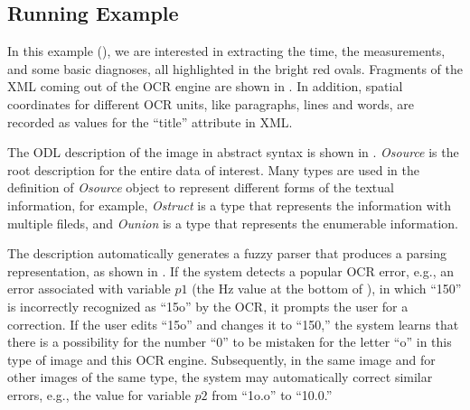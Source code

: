 \subsection{Running Example}
In this example (), 
we are interested in extracting the time, the measurements, 
and some basic diagnoses, all highlighted in the bright red ovals.
Fragments of the XML coming out of the OCR engine are shown 
in . In addition, spatial coordinates for different 
OCR units, like paragraphs, lines and words, are recorded as values  
for the ``title'' attribute in XML. 

The ODL description of the image in abstract syntax is shown
in . 
{\em Osource} is the root description for the entire data of interest. 
Many types are used in the definition of {\em Osource} object to represent 
different forms of the textual information, 
for example, {\em Ostruct} is a type that 
represents the information with multiple fileds, and {\em Ounion} is a 
type that represents the enumerable information. 

%





The description automatically generates a fuzzy parser 
that produces a parsing representation, as shown in . 
If the system detects a popular OCR error, e.g., an error associated with
variable $p1$ (the Hz value at the bottom of ),
in which ``150'' is incorrectly recognized as ``15o'' by the OCR,
it prompts the user for a correction. If the user edits 
``15o'' and changes it to ``150,'' the system learns 
that there is a possibility for the number ``0'' 
to be mistaken for the letter ``o'' in this type of image and this OCR engine.
Subsequently, in the same image and for other images of the same type, 
the system may automatically  correct similar errors, e.g., 
the value for variable $p2$ from ``1o.o'' to ``10.0.'' 

